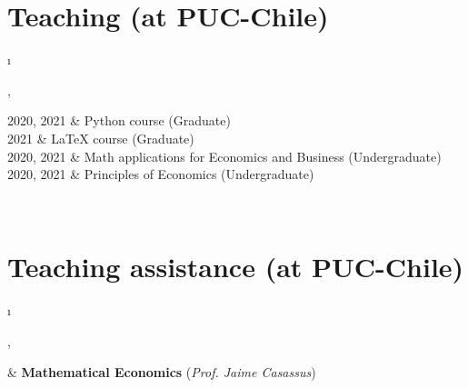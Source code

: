 \documentclass[a4paper, 10pt]{article}
\newcommand{\tablength}{}
\newcommand{\setTabParams}[1]{\renewcommand\tablength{}\forcsvlist{\listadd\tablength}{#1}}
\newcommand{\setCols}[1]{			%
	\ifnum0=\i						%
		\ifdim0cm=#1				%
			\def \firstCol {r}		%
		\else						%
			\def \firstCol {p{#1}}	%
		\fi							%
	\else \ifnum1=\i				%
		\ifdim0cm=#1				%
			\def \secondCol {l}		%
		\else						%
			\def \secondCol{p{#1}}	%
		\fi							%
	\else \ifnum2=\i				%
		\ifnum0=#1					%
			\def \sep {}			%
		\else						%
			\def \sep {|}			%
		\fi							%
	\fi \fi \fi						%
	\advance\i by1					%
}
\newcommand{\tab}[1]{							%
	\newcount\i									%
	\forlistloop{\setCols}{\tablength}			%
	\begin{tabular}{\firstCol \sep \secondCol}	%
		#1										%
	\end{tabular} \\[.5ex]						%
}
\begin{document}
%
%
%
%

\section{Teaching (at PUC-Chile)}
\setTabParams{0cm,11cm,1}

\tab{
\textsc{2020, 2021} 
	&	Python course (Graduate) \\[0.5ex]
\textsc{\phantom{2021, }2021} 
	&	LaTeX course (Graduate) \\[0.5ex]
\textsc{2020, 2021} 
	&	Math applications for Economics and Business (Undergraduate) \\[0.5ex]
\textsc{2020, 2021} 
	&	Principles of Economics (Undergraduate)
}

\section{Teaching assistance (at PUC-Chile)}
\setTabParams{14.5ex,11cm,1}

\tab{
	&	\textbf{Mathematical Economics} (\emph{Prof. Jaime Casassus})
}\\[-3ex]
\end{document}
